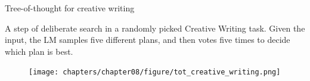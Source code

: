 \begin{vbframe}{Tree-of-thought for creative writing}

\vfill

A step of deliberate search in a randomly picked Creative Writing task. Given the input, the LM samples five different plans, and then votes five times to decide which plan is best.
    
\begin{figure}
    \centering
    \texttt{[image: chapters/chapter08/figure/tot\_creative\_writing.png]}\\
\end{figure}

\vfill

\end{vbframe}


\endlecture

